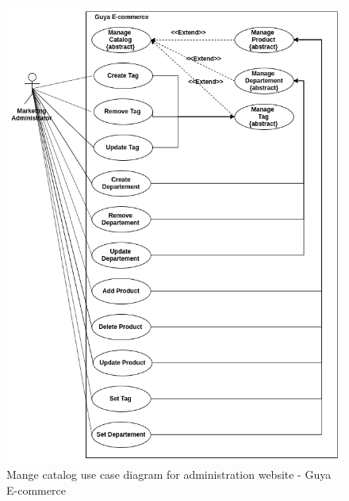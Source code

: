 \clearpage

\begin{figure}[!ht]
\centering
\includegraphics[width=15cm,keepaspectratio]{usecases/manage_catalog}
\caption{Mange catalog use case diagram for administration website - Guya E-commerce}
\end{figure}

\clearpage


